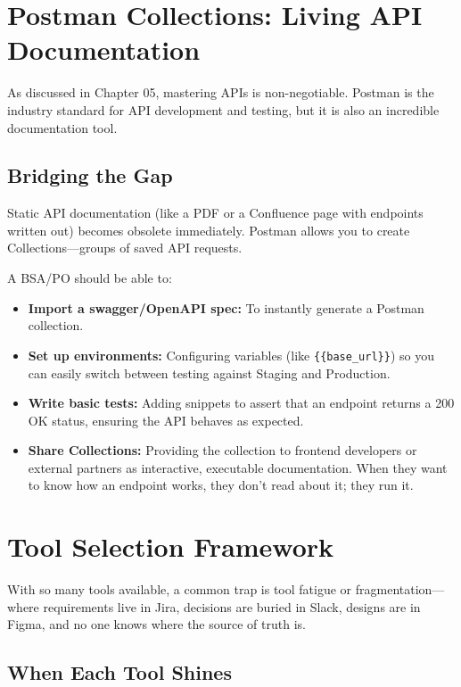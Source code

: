 \section{Postman Collections: Living API
Documentation}\label{postman-collections-living-api-documentation}

As discussed in Chapter 05, mastering APIs is non-negotiable. Postman is
the industry standard for API development and testing, but it is also an
incredible documentation tool.

\subsection{Bridging the Gap}\label{bridging-the-gap}

Static API documentation (like a PDF or a Confluence page with endpoints
written out) becomes obsolete immediately. Postman allows you to create
Collections---groups of saved API requests.

A BSA/PO should be able to:

\begin{itemize}
\tightlist
\item
  \textbf{Import a swagger/OpenAPI spec:} To instantly generate a
  Postman collection.
\item
  \textbf{Set up environments:} Configuring variables (like
  \texttt{\{\{base\_url\}\}}) so you can easily switch between testing
  against Staging and Production.
\item
  \textbf{Write basic tests:} Adding snippets to assert that an endpoint
  returns a 200 OK status, ensuring the API behaves as expected.
\item
  \textbf{Share Collections:} Providing the collection to frontend
  developers or external partners as interactive, executable
  documentation. When they want to know how an endpoint works, they
  don't read about it; they run it.
\end{itemize}

\section{Tool Selection Framework}\label{tool-selection-framework}

With so many tools available, a common trap is tool fatigue or
fragmentation---where requirements live in Jira, decisions are buried in
Slack, designs are in Figma, and no one knows where the source of truth
is.

\subsection{When Each Tool Shines}\label{when-each-tool-shines}

